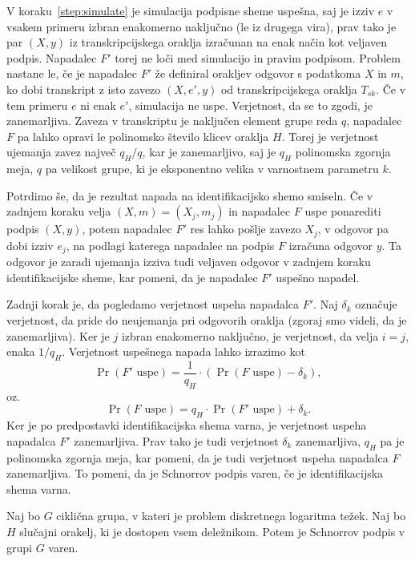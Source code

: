 \begin{dokaz}
\begin{enumerate}
    \end{enumerate}
    V koraku~\ref{step:simulate} je simulacija podpisne sheme uspešna, saj je izziv $e$ v vsakem
    primeru izbran enakomerno naključno (le iz drugega vira), prav tako je par $(X, y)$ iz
    transkripcijskega oraklja izračunan na enak način kot veljaven podpis. Napadalec $F'$ torej ne
    loči med simulacijo in pravim podpisom. Problem nastane le, če je napadalec $F'$ že definiral
    orakljev odgovor s podatkoma $X$ in $m$, ko dobi transkript z isto zavezo $(X, e', y)$
    od transkripcijskega oraklja $T_{sk}$. Če v tem primeru $e$ ni enak $e'$, simulacija ne uspe.
    Verjetnost, da se to zgodi, je zanemarljiva. Zaveza v transkriptu je naključen element grupe reda
    $q$, napadalec $F$ pa lahko opravi le polinomsko število klicev oraklja $H$. Torej je verjetnost
    ujemanja zavez največ $q_H/q$, kar je zanemarljivo, saj je $q_H$ polinomska zgornja meja, $q$ pa
    velikost grupe, ki je eksponentno velika v varnostnem parametru $k$.

    Potrdimo še, da je rezultat napada na identifikacijsko shemo smiseln. Če v zadnjem koraku velja
    $(X, m) = (X_j, m_j)$ in napadalec $F$ uspe ponarediti podpis $(X, y)$, potem napadalec $F'$
    res lahko pošlje zavezo $X_j$, v odgovor pa dobi izziv $e_j$, na podlagi katerega napadalec na
    podpis $F$ izračuna odgovor $y$. Ta odgovor je zaradi ujemanja izziva tudi veljaven odgovor
    v zadnjem koraku identifikacijske sheme, kar pomeni, da je napadalec $F'$ uspešno napadel.

    Zadnji korak je, da pogledamo verjetnost uspeha napadalca $F'$. Naj $\delta_k$ označuje verjetnost,
    da pride do neujemanja pri odgovorih oraklja (zgoraj smo videli, da je zanemarljiva). Ker je $j$
    izbran enakomerno naključno, je verjetnost, da velja $i=j$, enaka $1/q_H$. Verjetnost uspešnega
    napada lahko izrazimo kot
    $$
    \Pr(F' \text{ uspe}) = \frac{1}{q_H} \cdot (\Pr(F \text{ uspe}) - \delta_k),
    $$
    oz.
    $$
    \Pr(F \text{ uspe}) = q_H \cdot \Pr(F' \text{ uspe}) + \delta_k.
    $$
    Ker je po predpostavki identifikacijska shema varna, je verjetnost uspeha napadalca $F'$
    zanemarljiva. Prav tako je tudi verjetnost $\delta_k$ zanemarljiva, $q_H$ pa je polinomska zgornja
    meja, kar pomeni, da je tudi verjetnost uspeha napadalca $F$ zanemarljiva. To pomeni, da je
    Schnorrov podpis varen, če je identifikacijska shema varna.
\end{dokaz}

\begin{izrek}
    Naj bo $G$ ciklična grupa, v kateri je problem diskretnega logaritma težek. Naj bo $H$ slučajni
    orakelj, ki je dostopen vsem deležnikom. Potem je Schnorrov podpis v grupi $G$ varen.
\end{izrek}

